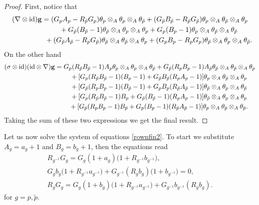 \documentclass[pdftex]{sigma}
\numberwithin{equation}{section}
\newcommand{\ip}{{\tilde{p}}}
\begin{document}
\begin{proof}First, notice that
\begin{gather*}
(\nabla\otimes\mathrm{id}){\bf g} =
(G_pA_p - R_\ip G_p)\theta_p\otimes_A\theta_p\otimes_A\theta_\ip +(G_\ip B_\ip-R_\ip G_\ip)\theta_p\otimes_A\theta_\ip\otimes_A\theta_p \\
\hphantom{(\nabla\otimes\mathrm{id}){\bf g} =}{}
+G_\ip(B_\ip-1)\theta_\ip\otimes_A\theta_p\otimes_A\theta_p+G_p(B_p-1)\theta_p\otimes_A\theta_\ip\otimes_A\theta_\ip\\
\hphantom{(\nabla\otimes\mathrm{id}){\bf g} =}{} +(G_\ip A_\ip-R_pG_\ip)\theta_\ip\otimes_A\theta_\ip\otimes_A\theta_p+(G_p B_p-R_pG_p )\theta_\ip\otimes_A\theta_p\otimes_A\theta_\ip.
\end{gather*}
On the other hand
\begin{gather*}
(\sigma\otimes\mathrm{id})(\mathrm{id}\otimes\nabla){\bf g} =
G_p(R_\ip B_\ip -1)A_p\theta_p\otimes_A\theta_p\otimes_A\theta_\ip+G_\ip(R_p B_p -1)A_\ip\theta_\ip\otimes_A\theta_\ip\otimes_A\theta_p \\
\hphantom{(\sigma\otimes\mathrm{id})(\mathrm{id}\otimes\nabla){\bf g} =}{}
+ [G_p(R_\ip B_\ip -1)(B_p-1)+G_\ip B_\ip(R_p A_p -1) ]\theta_p\otimes_A\theta_\ip\otimes_A\theta_p \\
\hphantom{(\sigma\otimes\mathrm{id})(\mathrm{id}\otimes\nabla){\bf g} =}{}
+ [G_\ip(R_p B_p -1)(B_\ip-1)+G_p B_p(R_\ip A_\ip -1) ]\theta_\ip\otimes_A\theta_p\otimes_A\theta_\ip \\
\hphantom{(\sigma\otimes\mathrm{id})(\mathrm{id}\otimes\nabla){\bf g} =}{}
+ [G_p(R_\ip B_\ip-1) B_p+G_\ip (B_\ip-1)(R_p A_p -1) ]\theta_\ip\otimes_A\theta_p\otimes_A\theta_p \\
\hphantom{(\sigma\otimes\mathrm{id})(\mathrm{id}\otimes\nabla){\bf g} =}{}
+ [G_\ip(R_p B_p-1) B_\ip+G_p(B_p-1)(R_\ip A_\ip -1) ]\theta_p\otimes_A\theta_\ip\otimes_A\theta_\ip.
\end{gather*}
Taking the sum of these two expressions we get the final result.
\end{proof}


Let us now solve the system of equations \eqref{rownfin2}. To start we substitute $A_g=a_g+1$ and $B_g=b_g+1$, then the equations
read
\begin{gather}
R_{g^{-1}}G_g=G_g(1+a_g)\big(1+R_{g^{-1}}b_{g^{-1}}\big),\nonumber\\
G_gb_g\big(1+R_{g^{-1}}a_{g^{-1}}\big)+G_{g^{-1}}(R_gb_g)\big(1+b_{g^{-1}}\big)=0,\nonumber\\
R_gG_g=G_g(1+b_g)\big(1+R_{g^{-1}}a_{g^{-1}}\big)+G_{g^{-1}}b_{g^{-1}}(R_gb_g).\label{rownfin2a}
\end{gather}
for $g=p,\ip$.
\end{document}
